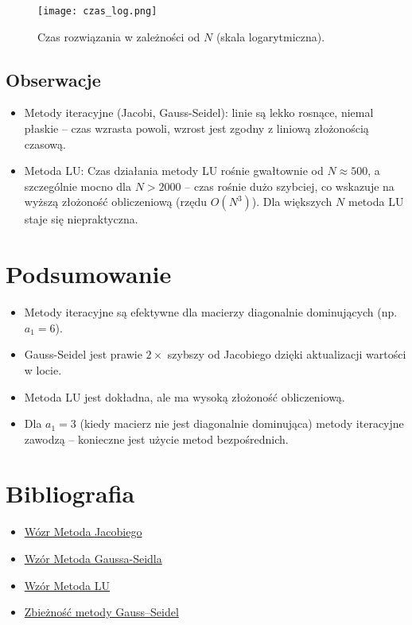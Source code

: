 \documentclass{article}
\begin{document}
\begin{figure}[H]
    \centering
    \texttt{[image: czas\_log.png]}
    \caption{Czas rozwiązania w zależności od $N$ (skala logarytmiczna).}
    \label{fig:czas_log}
\end{figure}

\subsection{Obserwacje}
\begin{itemize}
    \item Metody iteracyjne (Jacobi, Gauss-Seidel): linie są lekko rosnące, niemal płaskie – czas wzrasta powoli, wzrost jest zgodny z liniową złożonością czasową.
    \item Metoda LU: Czas działania metody LU rośnie gwałtownie od $N \approx 500$, a szczególnie mocno dla $N > 2000$ – czas rośnie dużo szybciej, co wskazuje na wyższą złożoność obliczeniową (rzędu $O(N^3)$). Dla większych $N$ metoda LU staje się niepraktyczna.
    \\
\end{itemize}
    
\section{Podsumowanie}
\begin{itemize}
    \item Metody iteracyjne są efektywne dla macierzy diagonalnie dominujących (np. $a_1 = 6$).
    \item Gauss-Seidel jest prawie $2\times$ szybszy od Jacobiego dzięki aktualizacji wartości w locie.
    \item Metoda LU jest dokładna, ale ma wysoką złożoność obliczeniową.
    \item Dla $a_1 = 3$ (kiedy macierz nie jest diagonalnie dominująca) metody iteracyjne zawodzą – konieczne jest użycie metod bezpośrednich.
    \\
\end{itemize}

\section{Bibliografia}
\begin{itemize}
    \item \href{https://en.wikipedia.org/wiki/Jacobi_method}{Wózr Metoda Jacobiego}
    \item \href{https://en.wikipedia.org/wiki/Gauss%E2%80%93Seidel_method}{Wzór Metoda Gaussa-Seidla}
    \item \href{https://en.wikipedia.org/wiki/LU_decomposition}{Wzór Metoda LU}
    \item \href{https://mst.mimuw.edu.pl/lecture.php?lecture=mo2&part=Ch5}{Zbieżność metody Gauss–Seidel}

\end{itemize}
\end{document}
